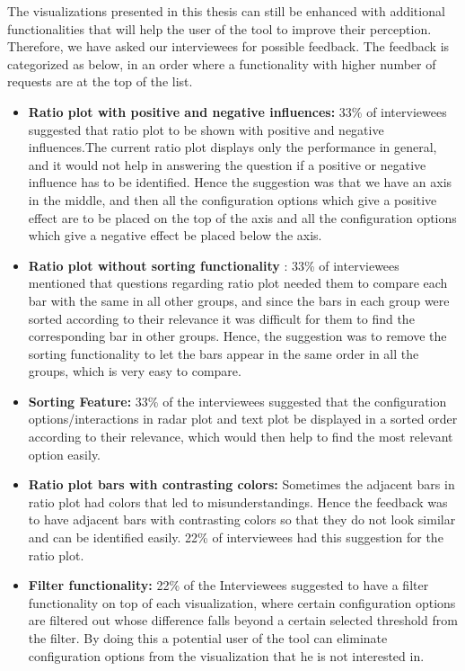 The visualizations presented in this thesis can still be enhanced with additional functionalities that will help the user of the tool to improve their perception. Therefore, we have asked our interviewees for possible feedback. The feedback is categorized as below, in an order where a functionality with higher number of requests are at the top of the list.

\begin{itemize}

 \item \textbf{Ratio plot with positive and negative influences:} 33\% of interviewees suggested that ratio plot to be shown with positive and negative influences.The current ratio plot displays only the performance in general, and it would not help in answering the question if a positive or negative influence has to be identified. Hence the suggestion was that we have an axis in the middle, and then all the configuration options which give a positive effect are to be placed on the top of the axis and all the configuration options which give a negative effect be placed below the axis.
 
 \item\textbf{Ratio plot without sorting functionality} : 33\% of interviewees mentioned that questions regarding ratio plot needed them to compare each bar with the same in all other groups, and since the bars in each group were sorted according to their relevance it was difficult for them to find the corresponding bar in other groups. Hence, the suggestion was to remove the sorting functionality to let the bars appear in the same order in all the groups, which is very easy to compare.
 
 \item \textbf{Sorting Feature:} 33\% of the interviewees suggested that the configuration options/interactions in radar plot and text plot be displayed in a sorted order according to their relevance, which would then help to find the most relevant option easily.
 
\item \textbf{Ratio plot bars with contrasting colors:} Sometimes the adjacent bars in ratio plot had colors that led to misunderstandings. Hence the feedback was to have adjacent bars with contrasting colors so that they do not look similar and can be identified easily. 22\% of interviewees had this suggestion for the ratio plot.
 
\item \textbf{Filter functionality:} 22\% of the Interviewees suggested to have a filter functionality on top of each visualization, where certain configuration options are filtered out whose difference falls beyond a certain selected threshold from the filter. By doing this a potential user of the tool can eliminate configuration options from the visualization that he is not interested in.


\end{itemize}
